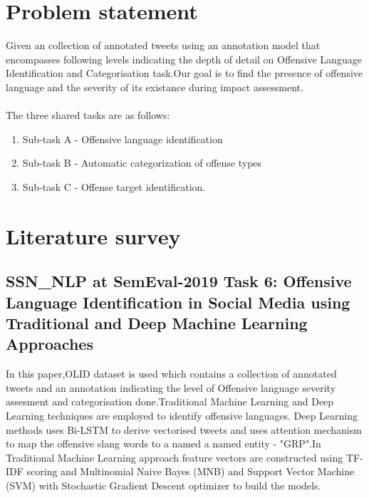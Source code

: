 \documentclass[12pt,a4paper]{article}
\begin{document}
\section{Problem statement}
Given an collection of annotated tweets using an annotation model that encompasses following levels indicating the depth of detail on Offensive Language Identification and Categorisation task.Our goal is to find the presence of offensive language and the severity of its existance during impact assessment. \\~\\
The three shared tasks are as follows:
\begin{enumerate}
	\item Sub-task A - Offensive language identification
	\item Sub-task B - Automatic categorization of offense types
	\item Sub-task C - Offense target identification.
\end{enumerate}

\section{Literature survey}
\subsection{SSN\_NLP at SemEval-2019 Task 6: Offensive Language Identification in Social Media using Traditional and Deep Machine Learning Approaches\cite{ssnNLPSemEvalT6}}
In this paper,OLID\cite{zampierietal2019} dataset is used which contains a collection of annotated tweets and an annotation indicating the level of Offensive language severity assesment and categorisation done.Traditional Machine Learning and Deep Learning techniques are employed to identify offensive languages.
Deep Learning methods uses Bi-LSTM to derive vectorised tweets and uses attention mechanism to map the offensive slang words to a named a named entity - "GRP".In Traditional Machine Learning approach feature vectors are constructed using TF-IDF scoring and Multinomial Naive Bayes (MNB) and Support Vector Machine (SVM) with Stochastic Gradient Descent optimizer to build the models. 
 
\end{document}
